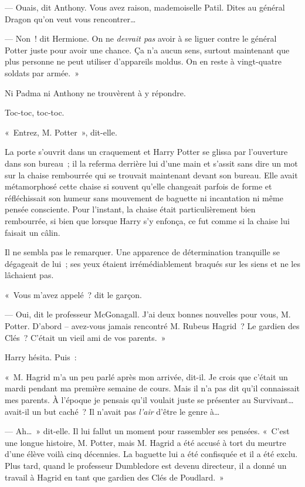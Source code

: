 --- Ouais, dit Anthony. Vous avez raison, mademoiselle Patil. Dites au général Dragon qu'on veut vous rencontrer…

--- Non~! dit Hermione. On ne \emph{devrait pas} avoir à se liguer contre le général Potter juste pour avoir une chance. Ça n'a aucun sens, surtout maintenant que plus personne ne peut utiliser d'appareils moldus. On en reste à vingt-quatre soldats par armée.~»

Ni Padma ni Anthony ne trouvèrent à y répondre.

\later

Toc-toc, toc-toc.

«~Entrez, M. Potter~», dit-elle.

La porte s'ouvrit dans un craquement et Harry Potter se glissa par l'ouverture dans son bureau~; il la referma derrière lui d'une main et s'assit sans dire un mot sur la chaise rembourrée qui se trouvait maintenant devant son bureau. Elle avait métamorphosé cette chaise si souvent qu'elle changeait parfois de forme et réfléchissait son humeur sans mouvement de baguette ni incantation ni même pensée consciente. Pour l'instant, la chaise était particulièrement bien rembourrée, si bien que lorsque Harry s'y enfonça, ce fut comme si la chaise lui faisait un câlin.

Il ne sembla pas le remarquer. Une apparence de détermination tranquille se dégageait de lui~; ses yeux étaient irrémédiablement braqués sur les siens et ne les lâchaient pas.

«~Vous m'avez appelé~? dit le garçon.

--- Oui, dit le professeur McGonagall. J'ai deux bonnes nouvelles pour vous, M. Potter. D'abord -- avez-vous jamais rencontré M. Rubeus Hagrid~? Le gardien des Clés~? C'était un vieil ami de vos parents.~»

Harry hésita. Puis~:

«~M. Hagrid m'a un peu parlé après mon arrivée, dit-il. Je crois que c'était un mardi pendant ma première semaine de cours. Mais il n'a pas dit qu'il connaissait mes parents. À l'époque je pensais qu'il voulait juste se présenter au Survivant… avait-il un but caché~? Il n'avait pas \emph{l'air} d'être le genre à…

--- Ah…~» dit-elle. Il lui fallut un moment pour rassembler ses pensées. «~C'est une longue histoire, M. Potter, mais M. Hagrid a été accusé à tort du meurtre d'une élève voilà cinq décennies. La baguette lui a été confisquée et il a été exclu. Plus tard, quand le professeur Dumbledore est devenu directeur, il a donné un travail à Hagrid en tant que gardien des Clés de Poudlard.~»

